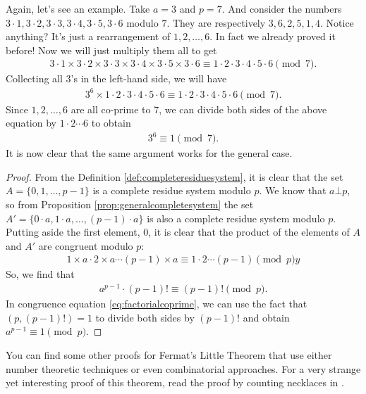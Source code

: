 \documentclass{subfile}
\begin{document}
	Again, let's see an example. Take $a=3$ and $p=7$. And consider the numbers $3\cdot1,3\cdot2,3\cdot3,3\cdot4,3\cdot5,3\cdot6$ modulo $7$. They are respectively $3,6,2,5,1,4$. Notice anything? It's just a rearrangement of $1,2,\ldots,6$. In fact we already proved it before! Now we will just multiply them all to get
		\begin{align*}
			3\cdot1\times3\cdot2\times3\cdot3\times3\cdot4\times3\cdot5\times3\cdot6  \equiv  1\cdot2\cdot3\cdot4\cdot5\cdot6 \pmod7.
		\end{align*}
	Collecting all $3$'s in the left-hand side, we will have
		\begin{align*}
			3^6\times1\cdot2\cdot3\cdot4\cdot5\cdot6  \equiv 1\cdot2\cdot3\cdot4\cdot5\cdot6 \pmod 7.
		\end{align*}
	Since $1,2,\ldots, 6$ are all co-prime to $7$, we can divide both sides of the above equation by $1\cdot 2 \cdots 6$ to obtain
		\begin{align*}
			3^6 \equiv 1 \pmod 7.
		\end{align*}
	 It is now clear that the same argument works for the general case\watermark.
		\begin{proof}
			From the Definition \ref{def:completeresiduesystem}, it is clear that the set $A=\{0, 1, \ldots, p-1\}$ is a complete residue system modulo $p$. We know that $a \bot p$, so from Proposition \ref{prop:generalcompletesystem} the set $A'=\{0 \cdot a, 1 \cdot a, \ldots, (p-1) \cdot a\}$ is also a complete residue system modulo $p$. Putting aside the first element, $0$, it is clear that the product of the elements of $A$ and $A'$ are congruent modulo $p$:
				\begin{align*}
				1 \times a \cdot 2 \times a \cdots (p-1) \times a  \equiv 1 \cdot 2 \cdots (p-1) \pmod py
				\end{align*}
			So, we find that
				\begin{align}
					a^{p-1} \cdot (p-1)! \equiv (p-1)! \pmod p. \label{eq:factorialcoprime}
				\end{align}
			In congruence equation \eqref{eq:factorialcoprime}, we can use the fact that $(p, (p-1)!)=1$ to divide both sides by $(p-1)!$ and obtain $a^{p-1} \equiv 1 \pmod p$.
		\end{proof}

	You can find some other proofs for Fermat's Little Theorem that use either number theoretic techniques or even combinatorial approaches. For a very strange yet interesting proof of this theorem, read the proof by counting necklaces in \textcite{engel_1997}.
\end{document}
